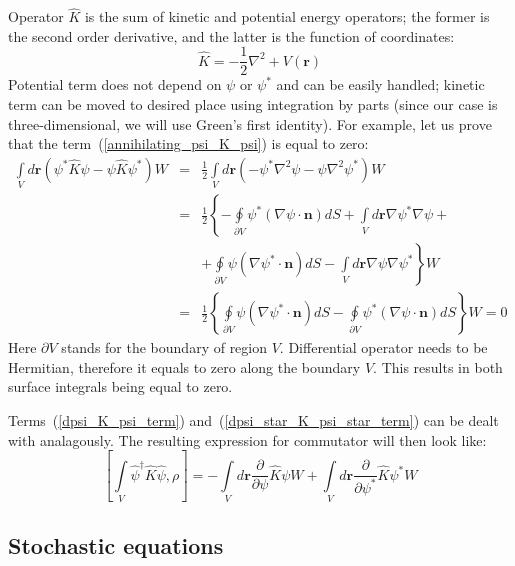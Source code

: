 \documentclass[12pt,notitlepage]{report}
\begin{document}
Operator $\hat{K}$ is the sum of kinetic and potential energy operators;
the former is the second order derivative, and the latter is the function of coordinates:
\[ \hat{K} = - \frac{1}{2} \nabla^2 + V(\textbf{r}) \]
Potential term does not depend on $\psi$ or $\psi^*$ and can be easily handled;
kinetic term can be moved to desired place using integration by parts
(since our case is three-dimensional, we will use Green's first identity).
For example, let us prove that the term~(\ref{annihilating_psi_K_psi}) is equal to zero:
\begin{eqnarray*}
\int\limits_V d\textbf{r} \left( \psi^* \hat{K} \psi - \psi \hat{K} \psi^* \right) W
& = & \frac{1}{2} \int\limits_V d\textbf{r} \left( - \psi^* \nabla^2 \psi - \psi \nabla^2 \psi^* \right) W \\
& = & \frac{1}{2} \left\{ - \oint\limits_{\partial V} \psi^* (\nabla \psi \cdot \textbf{n}) dS +
\int\limits_V d\textbf{r} \nabla \psi^* \nabla \psi \right. + \\
& & \left. + \oint\limits_{\partial V} \psi (\nabla \psi^* \cdot \textbf{n}) dS -
\int\limits_V d\textbf{r} \nabla \psi \nabla \psi^* \right\} W \\
& = & \frac{1}{2} \left\{ \oint\limits_{\partial V} \psi (\nabla \psi^* \cdot \textbf{n}) dS -
\oint\limits_{\partial V} \psi^* (\nabla \psi \cdot \textbf{n}) dS \right\} W = 0
\end{eqnarray*}
Here $\partial V$ stands for the boundary of region $V$.
Differential operator needs to be Hermitian, therefore it equals to zero along the boundary $V$.
This results in both surface integrals being equal to zero. 

Terms~(\ref{dpsi_K_psi_term}) and~(\ref{dpsi_star_K_psi_star_term}) can be dealt with analagously.
The resulting expression for commutator will then look like:
\[
[ \int\limits_V \hat{\psi}^\dagger \hat{K} \hat{\psi}, \rho ]  = - \int\limits_V d\textbf{r} \frac{\partial}{\partial\psi} \hat{K} \psi W +
\int\limits_V d\textbf{r} \frac{\partial}{\partial\psi^*} \hat{K} \psi^* W
\]

\subsection*{Stochastic equations}
\end{document}

